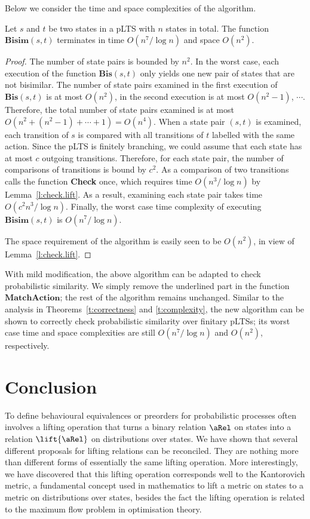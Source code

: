 \documentclass{article}
\begin{document}
Below we consider the time and space complexities of the algorithm.
\begin{theorem}\label{t:complexity}
Let $s$ and $t$ be two states in a pLTS with $n$ states in total.
The function $\textbf{Bisim}(s,t)$ terminates in time $O(n^7/\log
n)$ and space $O(n^2)$.
\end{theorem}
\begin{proof}
 The number
of state pairs is bounded by $n^2$. In the worst case, each
execution of the function $\textbf{Bis}(s,t)$ only yields one new
pair of states that are not bisimilar. The number of state pairs
examined in the first execution of $\textbf{Bis}(s,t)$ is at most
$O(n^2)$, in the second execution is at most $O(n^2-1)$, $\cdots$.
Therefore, the total number of state pairs examined is at most
$O(n^2+(n^2-1)+\cdots+1)=O(n^4)$. When a state pair $(s,t)$ is
examined, each transition of $s$ is compared with all transitions of
$t$ labelled with the same action. Since the pLTS is finitely
branching, we could assume that each state has at most $c$ outgoing
transitions. Therefore, for each state pair, the number of
comparisons of transitions is bound by $c^2$. As a comparison of two
transitions calls the function \textbf{Check} once, which requires
time $O(n^3/\log n)$ by Lemma~\ref{l:check.lift}. As a result,
examining each state pair takes time $O(c^2 n^3/\log n)$.
Finally, the worst case time complexity of executing
$\textbf{Bisim}(s,t)$ is $O(n^7/\log n)$.

The space requirement of the algorithm is easily seen to be
$O(n^2)$, in view of Lemma~\ref{l:check.lift}.
\end{proof}

\begin{remark} With mild modification, the above algorithm can be adapted to
check probabilistic similarity. We simply remove the underlined part
in the function $\textbf{MatchAction}$; the rest of the algorithm
remains unchanged. Similar to the analysis in
Theorems~\ref{t:correctness} and \ref{t:complexity}, the new
algorithm can be shown to correctly check probabilistic similarity
over finitary pLTSs; its worst case time and space complexities are
still $O(n^7/\log n)$ and  $O(n^2)$, respectively.
\end{remark}

\section{Conclusion}\label{s:conclude}
To define behavioural equivalences or preorders for probabilistic
processes often involves a lifting operation that turns a binary
relation $\aRel$ on states into a relation $\lift{\aRel}$ on
distributions over states. We have shown that several different
proposals for lifting relations can be reconciled. They are nothing
more than different forms of essentially the same lifting operation.
More interestingly, we have discovered that this lifting operation
corresponds well to the Kantorovich metric, a fundamental concept
used in mathematics to lift a metric on states to a metric on
distributions over states, besides the fact the lifting operation is
related to the maximum flow problem in optimisation theory.
\end{document}

